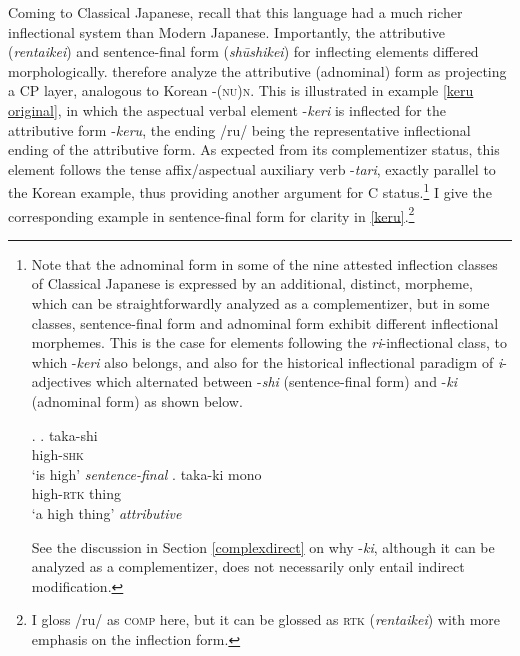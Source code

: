 \largerpage[2.5]
Coming to  Classical Japanese, recall that this language had a much richer inflectional system than Modern Japanese. Importantly, the attributive (\textit{rentaikei}) and sentence-final form (\textit{shūshikei}) for inflecting elements differed morphologically. \citet[31–33]{kaplan:1995:the} therefore analyze the attributive (adnominal) form as projecting a CP layer, analogous to  Korean -\textsc{(nu)n}. This is illustrated in example \ref{keru original}, in which the aspectual verbal element -\textit{keri} is inflected for the attributive form -\textit{keru}, the ending /ru/ being the representative inflectional ending of the attributive form. As expected from its complementizer status, this element follows the tense affix/aspectual auxiliary verb -\textit{tari}, exactly parallel to the Korean example, thus providing another argument for C status.\footnote{Note that the adnominal form in some of the nine attested inflection classes of Classical Japanese is expressed by an additional, distinct, morpheme, which can be straightforwardly analyzed as a complementizer, but in some classes, sentence-final form and adnominal form exhibit different inflectional morphemes. This is the case for elements following the \textit{ri}-inflectional class, to which -\textit{keri} also belongs, and also for the historical inflectional paradigm of \textit{i}-adjectives which alternated between -\textit{shi} (sentence-final form) and -\textit{ki} (adnominal form) as shown below.

\par

\ex. \ag. taka-shi\\
high-\textsc{shk}\\
`is high' \null \hfill \textit{sentence-final}
\bg. taka-ki mono\\
high-\textsc{rtk} thing\\
`a high thing' \null \hfill \textit{attributive}

\par

See the discussion in Section \ref{complexdirect} on why -\textit{ki}, although it can be analyzed as a complementizer, does not necessarily only entail indirect modification.} I give the corresponding example in sentence-final form for clarity in \ref{keru}.\footnote{I gloss /ru/ as \textsc{comp} here, but it can be glossed as \textsc{rtk} (\textit{rentaikei}) with more emphasis on the inflection form.}  

